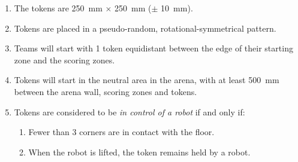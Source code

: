 \begin{enumerate}
  \item The tokens are \SI{250}{mm} $\times$ \SI{250}{mm} ($\pm$ \SI{10}{mm}).
  \item Tokens are placed in a pseudo-random, rotational-symmetrical pattern.
  \item Teams will start with 1 token equidistant between the edge of their
        starting zone and the scoring zones.
  \item Tokens will start in the neutral area in the arena, with at least \SI{500}{mm}
        between the arena wall, scoring zones and tokens.
  \item Tokens are considered to be \textit{in control of a robot } if and only if:
        \begin{enumerate}
          \item Fewer than 3 corners are in contact with the floor.
          \item When the robot is lifted, the token remains held by a robot.
        \end{enumerate}
\end{enumerate}
